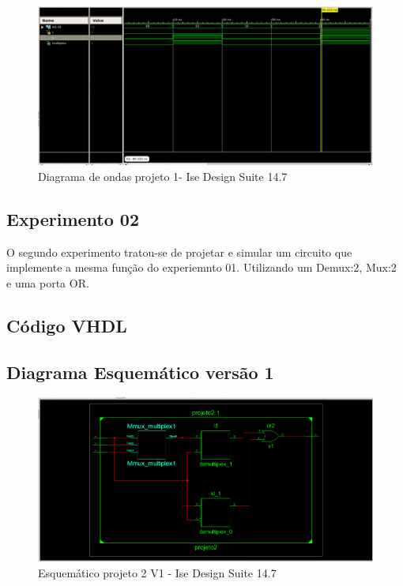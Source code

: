 \documentclass[12pts]{article}
\begin{document}
\begin{figure}[!htb]
  \centering
  \includegraphics[scale=0.35]{imagens/onda1}
  \caption{Diagrama de ondas projeto 1- Ise Design Suite 14.7}
  \label{figRotulo}
\end{figure}
\newpage

\subsection{Experimento 02}
	O segundo experimento tratou-se de projetar e simular um circuito que implemente a mesma função do experiemnto 01. Utilizando um Demux:2, Mux:2 e uma porta OR.

\clearpage
\subsection{Código VHDL}


\clearpage
\subsection{Diagrama Esquemático versão 1}
\begin{figure}[!htb]
  \centering
  \includegraphics[scale=0.45]{imagens/esquematico2}
  \caption{Esquemático projeto 2 V1 - Ise Design Suite 14.7}	
  \label{figRotulo}
\end{figure}
\end{document}
